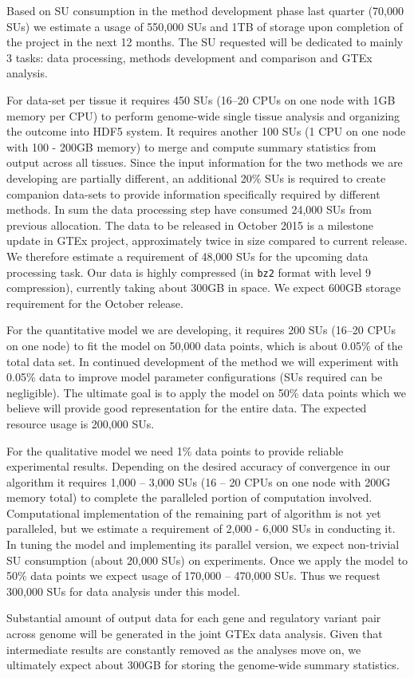\documentclass[10pt]{article}
\begin{document}
Based on SU consumption in the method development phase last quarter (70,000 SUs) we estimate a usage of 550,000 SUs and 1TB of storage upon completion of the project in the next 12 months. 
The SU requested will be dedicated to mainly 3 tasks: data processing, methods development and comparison and GTEx analysis.

For data-set per tissue it requires 450 SUs (16--20 CPUs on one node with 1GB memory per CPU) to perform genome-wide single tissue analysis and organizing the outcome into HDF5 system. 
It requires another 100 SUs (1 CPU on one node with 100 - 200GB memory) to merge and compute summary statistics from output across all tissues. 
Since the input information for the two methods we are developing are partially different, an additional 20\% SUs is required to create companion data-sets to provide information specifically required by different methods. 
In sum the data processing step have consumed 24,000 SUs from previous allocation. The data to be released in October 2015 is a milestone update in GTEx project, approximately twice in size compared to current release. 
We therefore estimate a requirement of 48,000 SUs for the upcoming data processing task. 
Our data is highly compressed (in \texttt{bz2} format with level 9 compression), currently taking about 300GB in space. We expect 600GB storage requirement for the October release.

For the quantitative model we are developing, it requires 200 SUs (16--20 CPUs on one node) to fit the model on 50,000 data points, which is about 0.05\% of the total data set. 
In continued development of the method we will experiment with 0.05\% data to improve model parameter configurations (SUs required can be negligible). 
The ultimate goal is to apply the model on 50\% data points which we believe will provide good representation for the entire data. 
The expected resource usage is 200,000 SUs.

For the qualitative model we need 1\% data points to provide reliable experimental results.
Depending on the desired accuracy of convergence in our algorithm it requires 1,000 -- 3,000 SUs (16 -- 20 CPUs on one node with 200G memory total) to complete the paralleled portion of computation involved.
Computational implementation of the remaining part of algorithm is not yet paralleled, but we estimate a requirement of 2,000 - 6,000 SUs in conducting it.
In tuning the model and implementing its parallel version, we expect non-trivial SU consumption (about 20,000 SUs) on experiments.
Once we apply the model to 50\% data points we expect usage of 170,000 -- 470,000 SUs.
Thus we request 300,000 SUs for data analysis under this model.

Substantial amount of output data for each gene and regulatory variant pair across genome will be generated in the joint GTEx data analysis. 
Given that intermediate results are constantly removed as the analyses move on, we ultimately expect about 300GB for storing the genome-wide summary statistics.

\printbibliography 
\end{document}
